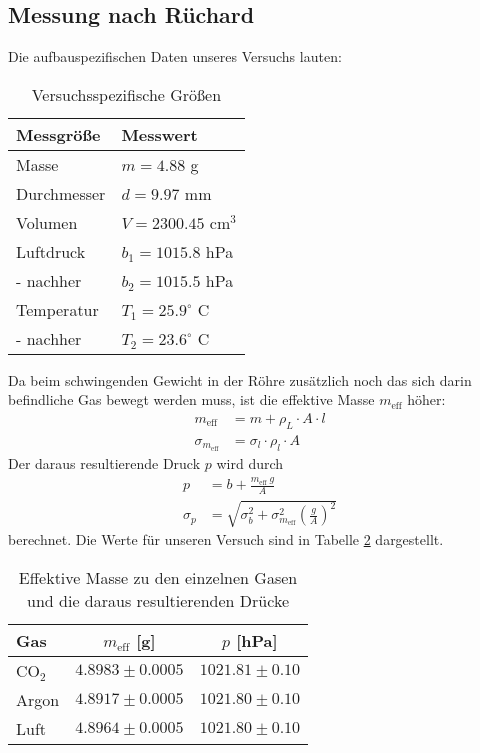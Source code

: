 \documentclass[12pt,a4paper,titlepage,headinclude,bibtotoc]{scrartcl}
\begin{document}
\subsection{Messung nach Rüchard}
Die aufbauspezifischen Daten unseres Versuchs lauten:
\begin{table}[!h]
	\centering
	\begin{tabular}{|l|l|}
		\hline
		Messgröße	& Messwert\\\hline\hline
		Masse		& $m=4.88$ g\\\hline
		Durchmesser	& $d=9.97$ mm\\\hline
		Volumen		& $V=2300.45$ cm$^3$\\\hline
		Luftdruck	& $b_1=1015.8$ hPa\\
		- nachher	& $b_2=1015.5$ hPa\\\hline
		Temperatur	& $T_1=25.9^\circ$ C\\
		- nachher	& $T_2=23.6^\circ$ C\\\hline
	\end{tabular}
	\caption{Versuchsspezifische Größen}
	\label{tab:versgr}
\end{table}
Da beim schwingenden Gewicht in der Röhre zusätzlich noch das sich darin befindliche Gas bewegt werden muss, ist die effektive Masse $m_\text{eff}$ höher:
\begin{align*}
	m_\text{eff}&=m+\rho_L \cdot A\cdot l\\
	\sigma_{m_\text{eff}}&=\sigma_l\cdot \rho_l \cdot A
\end{align*}
Der daraus resultierende Druck $p$ wird durch
\begin{align*}
	p&=b+\frac{m_\text{eff}~g}{A}\\
	\sigma_p&=\sqrt{\sigma_b^2+\sigma_{m_\text{eff}}^2\left(\frac{g}{A}\right)^2}
\end{align*}
berechnet.
Die Werte für unseren Versuch sind in Tabelle \ref{tab:effm} dargestellt.
\begin{table}[!htbp]
	\centering
	\begin{tabular}{|l|c|c|}
		\hline
		Gas	& $m_\text{eff}$ [g]	& $p$ [hPa]\\\hline\hline
		CO$_2$	& $4.8983 \pm 0.0005$ 	& $1021.81 \pm 0.10$ \\\hline
		Argon	& $4.8917 \pm 0.0005$ 	& $1021.80 \pm 0.10$ \\\hline
		Luft	& $4.8964 \pm 0.0005$ 	& $1021.80 \pm 0.10$ \\\hline
	\end{tabular}
	\caption{Effektive Masse zu den einzelnen Gasen und die daraus resultierenden Drücke} 
	\label{tab:effm}
\end{table}
\end{document}
